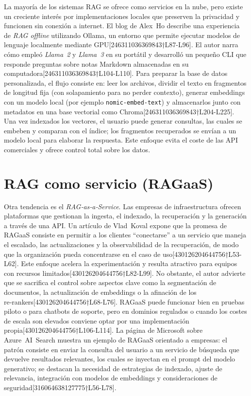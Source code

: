 La mayoría de los sistemas RAG se ofrece como servicios en la nube, pero existe un creciente interés por implementaciones locales que preserven la privacidad y funcionen sin conexión a internet.  El blog de Alex Ho describe una experiencia de \emph{RAG offline} utilizando Ollama, un entorno que permite ejecutar modelos de lenguaje localmente mediante GPU[246311036369843†L87-L96].  El autor narra cómo empleó \textit{Llama 2} y \textit{Llama 3} en su portátil y desarrolló un pequeño CLI que responde preguntas sobre notas Markdown almacenadas en su computadora[246311036369843†L104-L110].  Para preparar la base de datos personalizada, el flujo consiste en: leer los archivos, dividir el texto en fragmentos de longitud fija (con solapamiento para no perder contexto), generar embeddings con un modelo local (por ejemplo \texttt{nomic‑embed‑text}) y almacenarlos junto con metadatos en una base vectorial como Chroma[246311036369843†L204-L225].  Una vez indexados los vectores, el usuario puede generar consultas, las cuales se embeben y comparan con el índice; los fragmentos recuperados se envían a un modelo local para elaborar la respuesta.  Este enfoque evita el coste de las API comerciales y ofrece control total sobre los datos.

\section{RAG como servicio (RAGaaS)}

Otra tendencia es el \textit{RAG‑as‑a‑Service}.  Las empresas de infraestructura ofrecen plataformas que gestionan la ingesta, el indexado, la recuperación y la generación a través de una API.  Un artículo de Vlad Koval expone que la promesa de RAGaaS consiste en permitir a los clientes ``conectarse'' a un servicio que maneja el escalado, las actualizaciones y la observabilidad de la recuperación, de modo que la organización pueda concentrarse en el caso de uso[430126204644756†L53-L62].  Este enfoque acelera la experimentación y resulta atractivo para equipos con recursos limitados[430126204644756†L82-L99].  No obstante, el autor advierte que se sacrifica el control sobre aspectos clave como la segmentación de documentos, la actualización de embeddings o la afinación de los re‑rankers[430126204644756†L68-L76].  RAGaaS puede funcionar bien en pruebas piloto o para chatbots de soporte, pero en dominios regulados o cuando los costes de escala son elevados conviene optar por una implementación propia[430126204644756†L106-L114].  La página de Microsoft sobre Azure AI Search muestra un ejemplo de RAGaaS orientado a empresas: el patrón consiste en enviar la consulta del usuario a un servicio de búsqueda que devuelve resultados relevantes, los cuales se inyectan en el prompt del modelo generativo; se destacan la necesidad de estrategias de indexado, ajuste de relevancia, integración con modelos de embeddings y consideraciones de seguridad[316064638127775†L56-L78].

